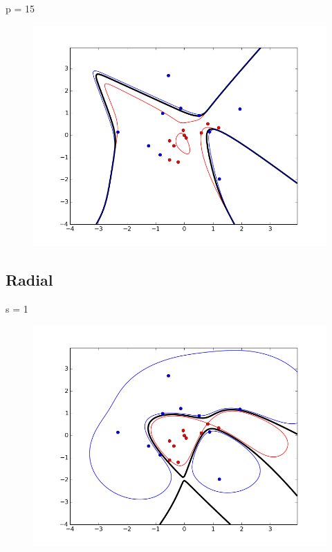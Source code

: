 \documentclass{article}
\begin{document}
p = 15
\begin{figure}[H]
    \centering
    \includegraphics[width=1.0\linewidth]{../img/poly_s1_p15.png}
\end{figure}

\subsection{Radial}

s = 1
\begin{figure}[H]
    \centering
    \includegraphics[width=1.0\linewidth]{../img/radial_s1_s1.png}
\end{figure}
\end{document}
